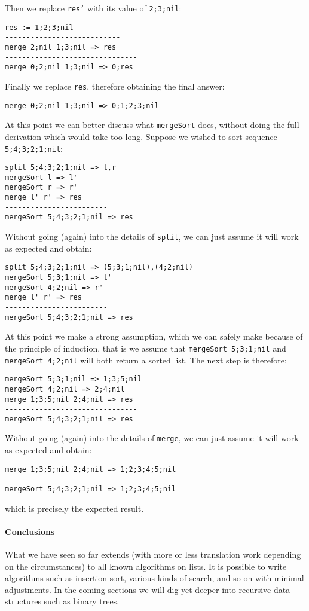 Then we replace \texttt{res'} with its value of \texttt{2;3;nil}:

\begin{lstlisting}
res := 1;2;3;nil
---------------------------
merge 2;nil 1;3;nil => res
-------------------------------
merge 0;2;nil 1;3;nil => 0;res
\end{lstlisting}

Finally we replace \texttt{res}, therefore obtaining the final answer:

\begin{lstlisting}
merge 0;2;nil 1;3;nil => 0;1;2;3;nil
\end{lstlisting}

At this point we can better discuss what \texttt{mergeSort} does, without doing the full derivation which would take too long. Suppose we wished to sort sequence \texttt{5;4;3;2;1;nil}:

\begin{lstlisting}
split 5;4;3;2;1;nil => l,r
mergeSort l => l'
mergeSort r => r'
merge l' r' => res
------------------------
mergeSort 5;4;3;2;1;nil => res
\end{lstlisting}

Without going (again) into the details of \texttt{split}, we can just assume it will work as expected and obtain:

\begin{lstlisting}
split 5;4;3;2;1;nil => (5;3;1;nil),(4;2;nil)
mergeSort 5;3;1;nil => l'
mergeSort 4;2;nil => r'
merge l' r' => res
------------------------
mergeSort 5;4;3;2;1;nil => res
\end{lstlisting}

At this point we make a strong assumption, which we can safely make because of the principle of induction, that is we assume that \texttt{mergeSort 5;3;1;nil} and \texttt{mergeSort 4;2;nil} will both return a sorted list. The next step is therefore:

\begin{lstlisting}
mergeSort 5;3;1;nil => 1;3;5;nil
mergeSort 4;2;nil => 2;4;nil
merge 1;3;5;nil 2;4;nil => res
-------------------------------
mergeSort 5;4;3;2;1;nil => res
\end{lstlisting}

Without going (again) into the details of \texttt{merge}, we can just assume it will work as expected and obtain:

\begin{lstlisting}
merge 1;3;5;nil 2;4;nil => 1;2;3;4;5;nil
-----------------------------------------
mergeSort 5;4;3;2;1;nil => 1;2;3;4;5;nil
\end{lstlisting}

which is precisely the expected result.

\paragraph{Conclusions}
What we have seen so far extends (with more or less translation work depending on the circumstances) to all known algorithms on lists. It is possible to write algorithms such as insertion sort, various kinds of search, and so on with minimal adjustments. In the coming sections we will dig yet deeper into recursive data structures such as binary trees.
